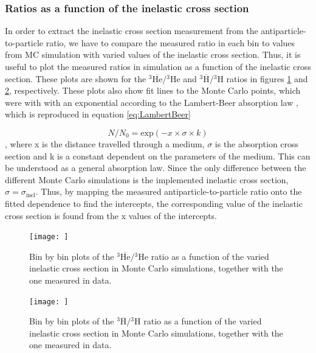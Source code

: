 \subsubsection{Ratios as a function of the inelastic cross section}
In order to extract the inelastic cross section measurement from the antiparticle-to-particle ratio, we have to compare the measured ratio in each bin to values from MC simulation with varied values of the inelastic cross section. Thus, it is useful to plot the measured ratios in simulation as a function of the inelastic cross section. These plots are shown for the $^3\overline{\mathrm{He}}/{^3\mathrm{He}}$ and $^3\overline{\mathrm{H}}/{^3\mathrm{H}}$ ratios in figures \ref{fig:Meth:RatiosAsFunctionsOfSigmaInel3He} and \ref{fig:Meth:RatiosAsFunctionsOfSigmaInel3H}, respectively. These plots also show fit lines to the Monte Carlo points, which were with with an exponential according to the Lambert-Beer absorption law \cite{}, which is reproduced in equation \ref{eq:LambertBeer}

\begin{equation}\label{eq:LambertBeer}
    N/N_0 = \mathrm{exp}\left( -x\times \sigma \times k \right)
\end{equation}
, where x is the distance travelled through a medium, $\sigma$ is the absorption cross section and k is a constant dependent on the parameters of the medium. This can be understood as a general absorption law. Since the only difference between the different Monte Carlo simulations is the implemented inelastic cross section, $\sigma = \sigma_\mathrm{inel}$. Thus, by mapping the measured antiparticle-to-particle ratio onto the fitted dependence to find the intercepts, the corresponding value of the inelastic cross section is found from the x values of the intercepts. 

\begin{figure}[htpb]
    \centering
    \texttt{[image: ]}
    \caption{Bin by bin plots of the $^3\overline{\mathrm{He}}/{^3\mathrm{He}}$ ratio as a function of the varied inelastic cross section in Monte Carlo simulations, together with the one measured in data.}
    \label{fig:Meth:RatiosAsFunctionsOfSigmaInel3He}
\end{figure}

\begin{figure}[htpb]
    \centering
    \texttt{[image: ]}
    \caption{Bin by bin plots of the $^3\overline{\mathrm{H}}/{^3\mathrm{H}}$ ratio as a function of the varied inelastic cross section in Monte Carlo simulations, together with the one measured in data.}
    \label{fig:Meth:RatiosAsFunctionsOfSigmaInel3H}
\end{figure}

